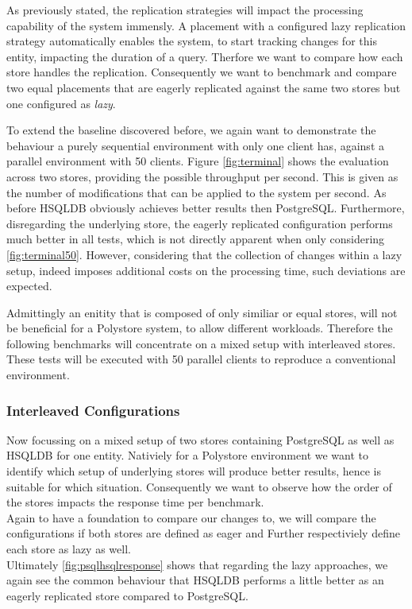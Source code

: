 As previously stated, the replication strategies will impact the processing capability of the system immensly.
A placement with a configured lazy replication strategy automatically enables the system, to start tracking changes for this entity, impacting the duration of a query.
Therfore we want to compare how each store handles the replication. Consequently we want to benchmark and compare two equal placements that are eagerly replicated
against the same two stores but one configured as \emph{lazy}.

To extend the baseline discovered before, we again want to demonstrate the behaviour a purely sequential environment with only one client has, 
against a parallel environment with 50 clients.
Figure \ref{fig:terminal} shows the evaluation across two stores, providing the possible throughput per second. This is given as the number of modifications that can be 
applied to the system per second. As before HSQLDB obviously achieves better results then PostgreSQL. Furthermore, disregarding the underlying store,
the eagerly replicated configuration performs much better in all tests, which is not directly apparent when only considering \ref{fig:terminal50}.
However, considering that the collection of changes within a lazy setup, indeed imposes additional costs on the processing time, such deviations are expected.


Admittingly an enitity that is composed of only similiar or equal stores, will not be beneficial for a Polystore system, to allow different workloads.
Therefore the following benchmarks will concentrate on a mixed setup with interleaved stores. These tests will be executed with 50 parallel clients to reproduce a 
conventional environment. 


\subsubsection{Interleaved Configurations}
Now focussing on a mixed setup of two stores containing PostgreSQL as well as HSQLDB for one entity.
Nativiely for a Polystore environment we want to identify which setup of underlying stores will produce better results, hence is suitable for which situation.
Consequently we want to observe how the order of the stores impacts the response time per benchmark.\\
Again to have a foundation to compare our changes to, we will compare the configurations if both stores are defined as eager and Further
respectiviely define each store as lazy as well.\\
Ultimately \ref{fig:psqlhsqlresponse} shows that regarding the lazy approaches, we again see the common behaviour that HSQLDB performs a little better as an eagerly replicated
store compared to PostgreSQL.


